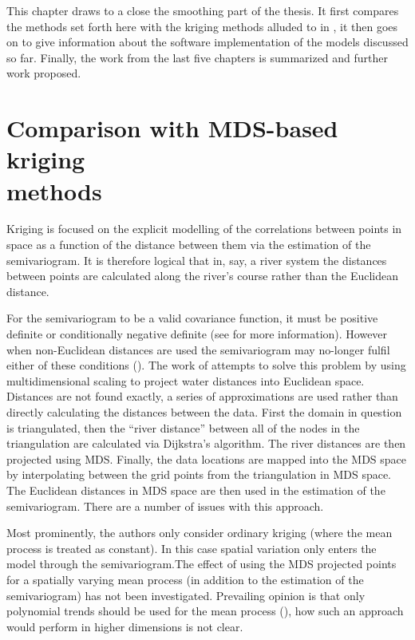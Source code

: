 \label{chap-fasend}

This chapter draws to a close the smoothing part of the thesis. It first compares the methods set forth here with the kriging methods alluded to in , it then goes on to give information about the software implementation of the models discussed so far. Finally, the work from the last five chapters is summarized and further work proposed.

\section{Comparison with MDS-based kriging\\methods}
\label{gds-krig}

Kriging is focused on the explicit modelling of the correlations between points in space as a function of the distance between them via the estimation of the semivariogram. It is therefore logical that in, say, a river system the distances between points are calculated along the river's course rather than the Euclidean distance. 

For the semivariogram to be a valid covariance function, it must be positive definite or conditionally negative definite (see \cite[p. 47]{diggle} for more information). However when non-Euclidean distances are used the semivariogram may no-longer fulfil either of these conditions (\cite{curriero}). The work of  attempts to solve this problem by using multidimensional scaling to project water distances into Euclidean space. Distances are not found exactly, a series of approximations are used rather than directly calculating the distances between the data. First the domain in question is triangulated, then the ``river distance'' between all of the nodes in the triangulation are calculated via Dijkstra's algorithm. The river distances are then projected using MDS. Finally, the data locations are mapped into the MDS space by interpolating between the grid points from the triangulation in MDS space.  The Euclidean distances in MDS space are then used in the estimation of the semivariogram. There are a number of issues with this approach. 

Most prominently, the authors only consider ordinary kriging (where the mean process is treated as constant). In this case spatial variation only enters the model through the semivariogram.The effect of using the MDS projected points for a spatially varying mean process (in addition to the estimation of the semivariogram) has not been investigated. Prevailing opinion is that only polynomial trends should be used for the mean process (\cite[p. 57]{diggle}), how such an approach would perform in higher dimensions is not clear.


